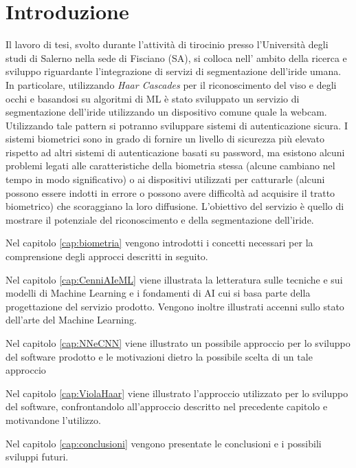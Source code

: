 \fancyhf{}
\cfoot{\thepage}
\pagestyle{fancy}
\chapter{Introduzione}

Il lavoro di tesi, svolto durante l’attività di tirocinio presso l'Università degli studi di Salerno nella sede di Fisciano (SA), si colloca nell' ambito della ricerca e sviluppo riguardante l'integrazione di servizi di segmentazione dell'iride umana. In particolare, utilizzando \textit{Haar Cascades} per il riconoscimento del viso e degli occhi e basandosi su algoritmi di \acf{ML} è stato sviluppato un servizio di segmentazione dell'iride utilizzando un dispositivo comune quale la webcam.
Utilizzando tale pattern si potranno sviluppare sistemi di autenticazione sicura.
I sistemi biometrici sono in grado di fornire un livello di
sicurezza più elevato rispetto ad altri sistemi di autenticazione basati su password, ma esistono alcuni problemi legati alle caratteristiche della biometria stessa (alcune cambiano nel tempo in modo significativo) o ai dispositivi utilizzati per catturarle (alcuni possono essere indotti in errore o possono avere difficoltà ad acquisire il tratto biometrico) che scoraggiano la loro diffusione. L'obiettivo del servizio è quello di mostrare il potenziale del riconoscimento e della segmentazione dell'iride. 

Nel capitolo \ref{cap:biometria} vengono introdotti i concetti necessari per la comprensione degli approcci descritti in seguito.

Nel capitolo \ref{cap:CenniAIeML} viene illustrata la letteratura sulle tecniche e sui modelli di Machine Learning e i fondamenti di \acf{AI} cui si basa parte della progettazione del servizio prodotto. Vengono inoltre illustrati accenni sullo stato dell'arte del Machine Learning.

Nel capitolo \ref{cap:NNeCNN} viene illustrato un possibile approccio per lo sviluppo del software prodotto e le motivazioni dietro la possibile scelta di un tale approccio

Nel capitolo \ref{cap:ViolaHaar} viene illustrato l'approccio utilizzato per lo sviluppo del software, confrontandolo all'approccio descritto nel precedente capitolo e motivandone l'utilizzo.

Nel capitolo \ref{cap:conclusioni} vengono presentate le conclusioni e i possibili sviluppi futuri.